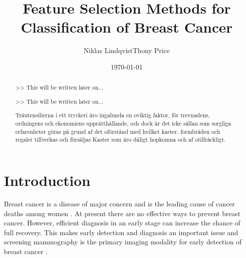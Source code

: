 \documentclass{kththesis}
\title{Feature Selection Methods for Classification of Breast Cancer}
\author{Niklas Lindqvist\newline Thony Price}
\date{\today}
\begin{document}
\frontmatter

\titlepage

\begin{abstract}
  >> This will be written later on...

  \blindtext
\end{abstract}


\begin{otherlanguage}{swedish}
  \begin{abstract}

    >> This will be written later on...

    Träutensilierna i ett tryckeri äro ingalunda en oviktig faktor,
    för trevnadens, ordningens och ekonomiens upprätthållande, och
    dock är det icke sällan som sorgliga erfarenheter göras på grund
    af det oförstånd med hvilket kaster, formbräden och regaler
    tillverkas och försäljas Kaster som äro dåligt hopkomna och af
    otillräckligt.
  \end{abstract}
\end{otherlanguage}


\tableofcontents


\mainmatter


\chapter{Introduction}





Breast cancer is a disease of major concern and is the leading cause of cancer deaths among women \parencite{althuis2005}. At present there are no effective ways to prevent breast cancer. However, efficient diagnosis in an early stage can increase the chance of full recovery. This makes early detection and diagnosis an important issue and screening mammography is the primary imaging modality for early detection of breast cancer \parencite{tabar2001}.
\end{document}
